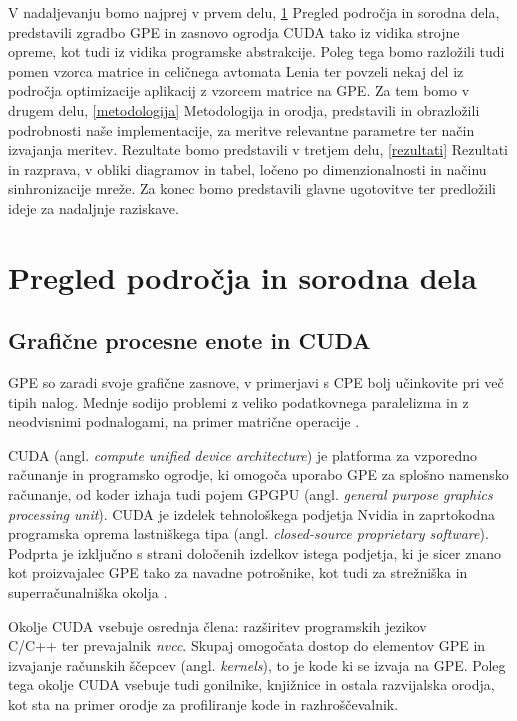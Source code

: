 \documentclass[a4paper, 12pt, openright]{book}
\begin{document}
V nadaljevanju bomo najprej v prvem delu, \ref{pregled} Pregled področja in sorodna dela, predstavili zgradbo GPE in zasnovo ogrodja CUDA tako iz vidika strojne opreme, kot tudi iz vidika programske abstrakcije.
Poleg tega bomo razložili tudi pomen vzorca matrice in celičnega avtomata Lenia ter povzeli nekaj del iz področja optimizacije aplikacij z vzorcem matrice na GPE.
Za tem bomo v drugem delu, \ref{metodologija} Metodologija in orodja, predstavili in obrazložili podrobnosti naše implementacije, za meritve relevantne parametre ter način izvajanja meritev.
Rezultate bomo predstavili v tretjem delu, \ref{rezultati} Rezultati in razprava, v obliki diagramov in tabel, ločeno po dimenzionalnosti in načinu sinhronizacije mreže.
Za konec bomo predstavili glavne ugotovitve ter predložili ideje za nadaljnje raziskave.

\chapter{Pregled področja in sorodna dela}
\label{pregled}

\section{Grafične procesne enote in CUDA}
\label{gpus}
\raggedbottom

GPE so zaradi svoje grafične zasnove, v primerjavi s CPE bolj učinkovite pri več tipih nalog.
Mednje sodijo problemi z veliko podatkovnega paralelizma in z neodvisnimi podnalogami, na primer matrične operacije \cite{Surina_2009}.

CUDA (angl. \textit{compute unified device architecture}) je platforma za vzporedno računanje in programsko ogrodje, ki omogoča uporabo GPE za splošno namensko računanje, od koder izhaja tudi pojem GPGPU (angl. \textit{general purpose graphics processing unit}).
CUDA je izdelek tehnološkega podjetja Nvidia in zaprtokodna programska oprema lastniškega tipa (angl. \textit{closed-source proprietary software}).
Podprta je izključno s strani določenih izdelkov istega podjetja, ki je sicer znano kot proizvajalec GPE tako za navadne potrošnike, kot tudi za strežniška in superračunalniška okolja \cite{cuda-programming-guide, enwiki:1339431307}.

Okolje \hfill CUDA \hfill vsebuje \hfill osrednja \hfill člena: \hfill razširitev \hfill programskih \hfill jezikov \\C/C++ ter prevajalnik \textit{nvcc}.
Skupaj omogočata dostop do elementov GPE in izvajanje računskih ščepcev (angl. \textit{kernels}), to je kode ki se izvaja na GPE. Poleg tega okolje CUDA vsebuje tudi gonilnike, knjižnice in ostala razvijalska orodja, kot sta na primer orodje za profiliranje kode in razhroščevalnik.
\end{document}
